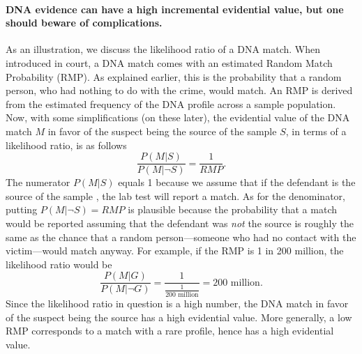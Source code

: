 \documentclass[10pt]{article}
\begin{document}
\paragraph{DNA evidence can have a high incremental evidential value, but one should beware of complications.}

As an illustration, we discuss the likelihood ratio 
of a DNA match. %
When introduced in court, a DNA match comes with an 
estimated Random Match Probability (RMP).  As explained earlier, this
is the probability that a random person, who 
had nothing to do with the crime, would match. An RMP is derived from the estimated frequency of the DNA profile across a sample population. 
%
Now, with some simplifications (on these later), 
the evidential value of the DNA 
match $M$ in favor of the suspect being the source of the sample $S$, in terms of a likelihood ratio, 
is as follows %
%
\[
\frac{P(M | S)}{P(M | \neg S)} =   \frac{1}{RMP}.
\]
%
The numerator $P(M | S)$ equals 1 because we assume that %
if the defendant is the source of the sample%
, the lab test will report a match. As for the denominator, 
putting $P(M | \neg S)=RMP$ is plausible because the probability that a match would be reported assuming that the defendant was \textit{not} 
the source is roughly the same as the chance that a random person---someone who had no contact with the victim---would match anyway. 
For example, if the RMP is 1 in 200 million, the likelihood ratio would be
%
\[\frac{P(M |G)}{P( M | \neg G)}=\frac{1}{\frac{1}{\text{200 million}}}=\text{200 million}.\]
%
Since the likelihood ratio in question is a high number, the DNA match in favor of the suspect being the source
has a high evidential value. More generally, a low RMP corresponds to a match with a rare profile, hence has a high evidential value. 
\end{document}
